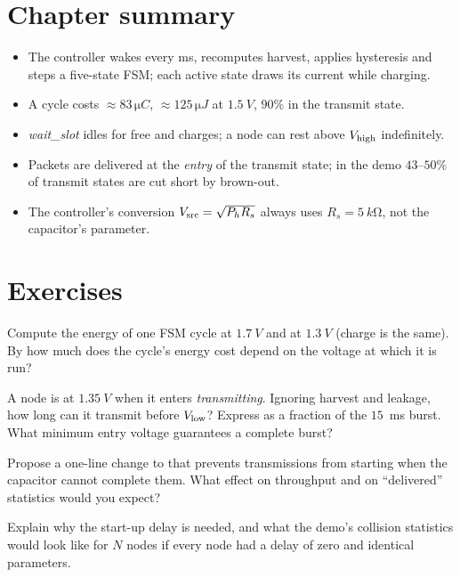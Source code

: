 \section{Chapter summary}
\begin{itemize}
 \item The controller wakes every ms, recomputes harvest, applies hysteresis and steps a five-state FSM; each active state draws its current while charging.
 \item A cycle costs $\approx83\,\si{\micro C}$, $\approx125\,\si{\micro J}$ at $\SI{1.5}{V}$, $90\%$ in the transmit state.
 \item \emph{wait\_slot} idles for free and charges; a node can rest above $V_{\mathrm{high}}$ indefinitely.
 \item Packets are delivered at the \emph{entry} of the transmit state; in the demo $43$--$50\%$ of transmit states are cut short by brown-out.
 \item The controller's conversion $V_{\mathrm{src}}=\sqrt{P_h R_s}$ always uses $R_s=\SI{5}{k\ohm}$, not the capacitor's parameter.
\end{itemize}

\section*{Exercises}
\begin{exercise}
Compute the energy of one FSM cycle at $\SI{1.7}{V}$ and at $\SI{1.3}{V}$ (charge is the same). By how much does the cycle's energy cost depend on the voltage at which it is run?
\end{exercise}
\begin{exercise}
A node is at $\SI{1.35}{V}$ when it enters \emph{transmitting}. Ignoring harvest and leakage, how long can it transmit before $V_{\mathrm{low}}$? Express as a fraction of the $15$~ms burst. What minimum entry voltage guarantees a complete burst?
\end{exercise}
\begin{exercise}
Propose a one-line change to  that prevents transmissions from starting when the capacitor cannot complete them. What effect on throughput and on ``delivered'' statistics would you expect?
\end{exercise}
\begin{exercise}
Explain why the start-up delay is needed, and what the demo's collision statistics would look like for $N$ nodes if every node had a delay of zero and identical parameters.
\end{exercise}
